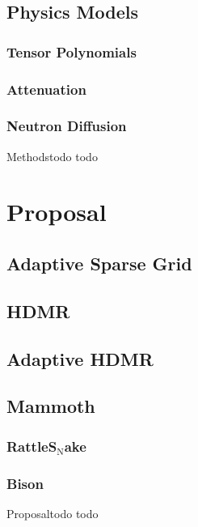 \documentclass{beamer}
\begin{document}
\subsection{Physics Models}
\subsubsection{Tensor Polynomials}
\subsubsection{Attenuation}
\subsubsection{Neutron Diffusion}

\begin{frame}{Methods}{todo}
  todo
\end{frame}

\section{Proposal}

\subsection{Adaptive Sparse Grid}
\subsection{HDMR}
\subsection{Adaptive HDMR}
\subsection{Mammoth}
\subsubsection{RattleS$_\text{N}$ake}
\subsubsection{Bison}

\begin{frame}{Proposal}{todo}
  todo
\end{frame}
\end{document}
